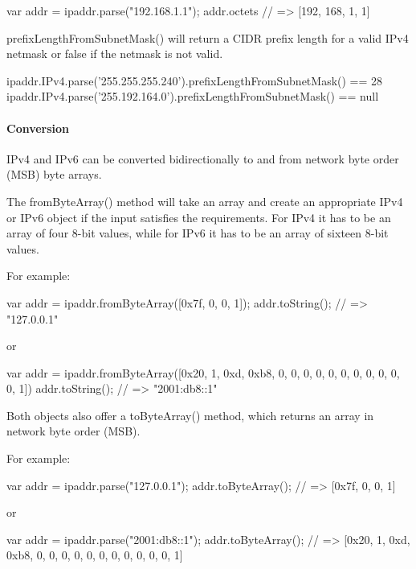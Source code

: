 \begin{DoxyCode}
var addr = ipaddr.parse("192.168.1.1");
addr.octets // => [192, 168, 1, 1]
\end{DoxyCode}


{\ttfamily prefix\+Length\+From\+Subnet\+Mask()} will return a C\+I\+DR prefix length for a valid I\+Pv4 netmask or false if the netmask is not valid.


\begin{DoxyCode}
ipaddr.IPv4.parse('255.255.255.240').prefixLengthFromSubnetMask() == 28
ipaddr.IPv4.parse('255.192.164.0').prefixLengthFromSubnetMask()  == null
\end{DoxyCode}


\paragraph*{Conversion}

I\+Pv4 and I\+Pv6 can be converted bidirectionally to and from network byte order (M\+SB) byte arrays.

The {\ttfamily from\+Byte\+Array()} method will take an array and create an appropriate I\+Pv4 or I\+Pv6 object if the input satisfies the requirements. For I\+Pv4 it has to be an array of four 8-\/bit values, while for I\+Pv6 it has to be an array of sixteen 8-\/bit values.

For example\+: 
\begin{DoxyCode}
var addr = ipaddr.fromByteArray([0x7f, 0, 0, 1]);
addr.toString(); // => "127.0.0.1"
\end{DoxyCode}


or


\begin{DoxyCode}
var addr = ipaddr.fromByteArray([0x20, 1, 0xd, 0xb8, 0, 0, 0, 0, 0, 0, 0, 0, 0, 0, 0, 1])
addr.toString(); // => "2001:db8::1"
\end{DoxyCode}


Both objects also offer a {\ttfamily to\+Byte\+Array()} method, which returns an array in network byte order (M\+SB).

For example\+: 
\begin{DoxyCode}
var addr = ipaddr.parse("127.0.0.1");
addr.toByteArray(); // => [0x7f, 0, 0, 1]
\end{DoxyCode}


or


\begin{DoxyCode}
var addr = ipaddr.parse("2001:db8::1");
addr.toByteArray(); // => [0x20, 1, 0xd, 0xb8, 0, 0, 0, 0, 0, 0, 0, 0, 0, 0, 0, 1]
\end{DoxyCode}
 
